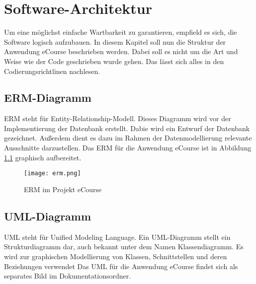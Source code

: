 \chapter{Software-Architektur}

Um eine möglichst einfache Wartbarkeit zu garantieren, empfield es sich, die Software logisch aufzubauen. In diesem Kapitel soll nun die Struktur der Anwendung eCourse beschrieben werden. Dabei soll es nicht um die Art und Weise wie der Code geschrieben wurde gehen. Das lässt sich alles in den Codierungsrichtlinen nachlesen.

\section{ERM-Diagramm}
ERM steht für Entity-Relationship-Modell. Dieses Diagramm wird vor der Implementierung der Datenbank erstellt. Dabie wird ein Entwurf der Datenbank gezeichnet. Außerdem dient es dazu im Rahmen der Datenmodellierung relevante Ausschnitte darzustellen. Das ERM für die Anwendung eCourse ist in Abbildung \ref{fib:erm} graphisch aufbereitet.

\begin{figure}[H]
\centering
\texttt{[image: erm.png]}
\caption{ERM im Projekt eCourse}
\label{fib:erm}
\end{figure}

\section{UML-Diagramm}
UML steht für Unified Modeling Language. Ein UML-Diagramm stellt ein Strukturdiagramm dar, auch bekannt unter dem Namen Klassendiagramm. Es wird zur graphischen Modellierung von Klassen, Schnittstellen und deren Beziehungen verwendet \newline
Das UML für die Anwendung eCourse findet sich als separates Bild im Dokumentationsordner.
